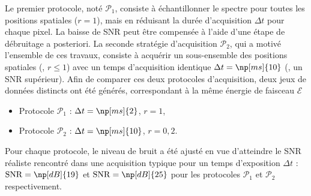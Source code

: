 Le premier protocole, noté $\mathcal{P}_1$, consiste à échantillonner le spectre pour toutes les positions spatiales ($r=1$), mais en réduisant la durée d'acquisition $\Delta t$ pour chaque pixel. La baisse de SNR peut être compensée à l'aide d'une étape de débruitage a posteriori.
%
La seconde stratégie d'acquisition $\mathcal{P}_2$, qui a motivé l'ensemble de ces travaux, consiste à acquérir un sous-ensemble des positions spatiales (\ie{}, $r\leq 1$) avec un temps d'acquisition identique $\Delta t= \np[ms]{10}$ (\ie{}, un SNR supérieur). 
%
Afin de comparer ces deux protocoles d'acquisition, deux jeux de données distincts ont été générés, correspondant à la même énergie de faisceau $\mathcal{E}$
\begin{itemize}
    \item Protocole $\mathcal{P}_1$ : $\Delta t=\np[ms]{2}$, $r=1$,
    \item Protocole $\mathcal{P}_2$ : $\Delta t=\np[ms]{10}$, $r=0,2$.
\end{itemize}
Pour chaque protocole, le niveau de bruit a été ajusté en vue d'atteindre le SNR réaliste rencontré dans une acquisition typique pour un temps d'exposition $\Delta t$ : $\mathrm{SNR} = \np[dB]{19}$ et $\mathrm{SNR} = \np[dB]{25}$ pour les protocoles $\mathcal{P}_1$ et $\mathcal{P}_2$ respectivement.

